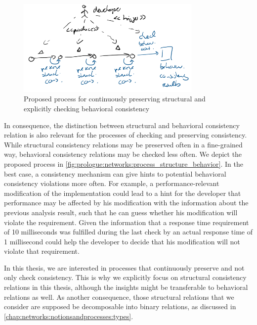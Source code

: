 \begin{figure}
    \centering
    \includegraphics[width=0.8\textwidth]{figures/prologue/process_structure_behavior.png}
    \caption{Proposed process for continuously preserving structural and explicitly checking behavioral consistency}
    \label{fig:prologue:networks:process_structure_behavior}
\end{figure}

In consequence, the distinction between structural and behavioral consistency relation is also relevant for the processes of checking and preserving consistency.
While structural consistency relations may be preserved often in a fine-grained way, behavioral consistency relations may be checked less often.
We depict the proposed process in \autoref{fig:prologue:networks:process_structure_behavior}.
In the best case, a consistency mechanism can give hints to potential behavioral consistency violations more often.
For example, a performance-relevant modification of the implementation could lead to a hint for the developer that performance may be affected by his modification with the information about the previous analysis result, such that he can guess whether his modification will violate the requirement.
Given the information that a response time requirement of 10 milliseconds was fulfilled during the last check by an actual response time of 1 millisecond could help the developer to decide that his modification will not violate that requirement.

In this thesis, we are interested in processes that continuously preserve and not only check consistency.
This is why we explicitly focus on structural consistency relations in this thesis, although the insights might be transferable to behavioral relations as well.
As another consequence, those structural relations that we consider are supposed be decomposable into binary relations, as discussed in \autoref{chap:networks:notionsandprocesses:types}.



